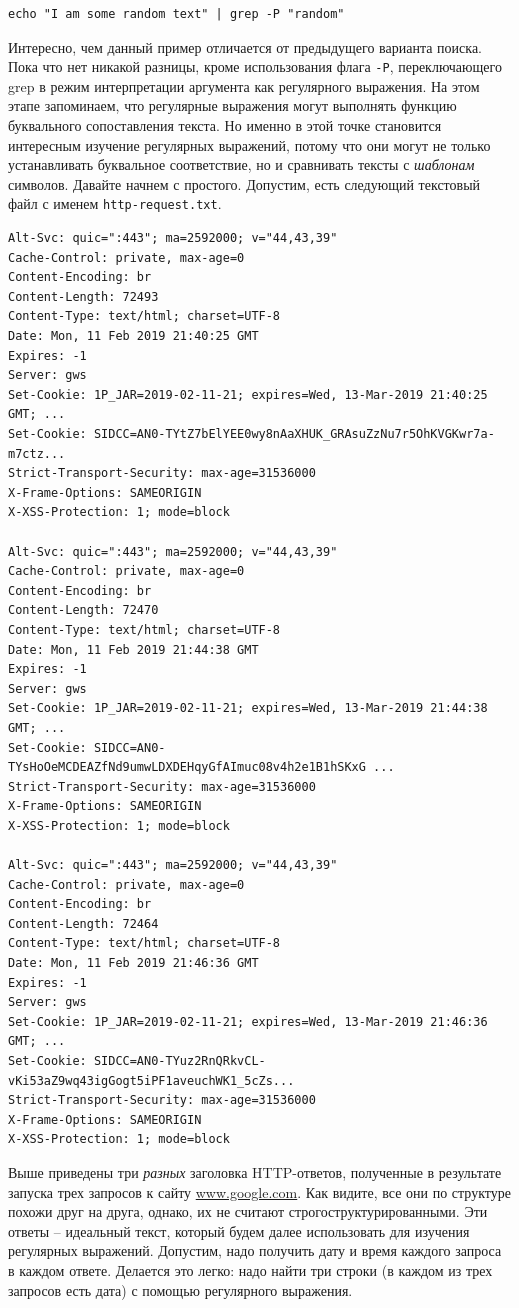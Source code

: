 \documentclass[12pt]{article}
\begin{document}
\begin{verbatim}
echo "I am some random text" | grep -P "random"
\end{verbatim}

Интересно, чем данный пример отличается от предыдущего варианта поиска.
Пока что нет никакой разницы, кроме использования флага \texttt{-P},
переключающего grep в режим интерпретации аргумента как регулярного
выражения. На этом этапе запоминаем, что регулярные выражения могут
выполнять функцию буквального сопоставления текста. Но именно в этой
точке становится интересным изучение регулярных выражений, потому что
они могут не только устанавливать буквальное соответствие, но и
сравнивать тексты с \emph{шаблонам} символов. Давайте начнем с простого.
Допустим, есть следующий текстовый файл с именем
\texttt{http-request.txt}.

\begin{verbatim}
Alt-Svc: quic=":443"; ma=2592000; v="44,43,39"
Cache-Control: private, max-age=0
Content-Encoding: br
Content-Length: 72493
Content-Type: text/html; charset=UTF-8
Date: Mon, 11 Feb 2019 21:40:25 GMT
Expires: -1
Server: gws
Set-Cookie: 1P_JAR=2019-02-11-21; expires=Wed, 13-Mar-2019 21:40:25 GMT; ...
Set-Cookie: SIDCC=AN0-TYtZ7bElYEE0wy8nAaXHUK_GRAsuZzNu7r5OhKVGKwr7a-m7ctz...
Strict-Transport-Security: max-age=31536000
X-Frame-Options: SAMEORIGIN
X-XSS-Protection: 1; mode=block

Alt-Svc: quic=":443"; ma=2592000; v="44,43,39"
Cache-Control: private, max-age=0
Content-Encoding: br
Content-Length: 72470
Content-Type: text/html; charset=UTF-8
Date: Mon, 11 Feb 2019 21:44:38 GMT
Expires: -1
Server: gws
Set-Cookie: 1P_JAR=2019-02-11-21; expires=Wed, 13-Mar-2019 21:44:38 GMT; ...
Set-Cookie: SIDCC=AN0-TYsHoOeMCDEAZfNd9umwLDXDEHqyGfAImuc08v4h2e1B1hSKxG ...
Strict-Transport-Security: max-age=31536000
X-Frame-Options: SAMEORIGIN
X-XSS-Protection: 1; mode=block

Alt-Svc: quic=":443"; ma=2592000; v="44,43,39"
Cache-Control: private, max-age=0
Content-Encoding: br
Content-Length: 72464
Content-Type: text/html; charset=UTF-8
Date: Mon, 11 Feb 2019 21:46:36 GMT
Expires: -1
Server: gws
Set-Cookie: 1P_JAR=2019-02-11-21; expires=Wed, 13-Mar-2019 21:46:36 GMT; ...
Set-Cookie: SIDCC=AN0-TYuz2RnQRkvCL-vKi53aZ9wq43igGogt5iPF1aveuchWK1_5cZs...
Strict-Transport-Security: max-age=31536000
X-Frame-Options: SAMEORIGIN
X-XSS-Protection: 1; mode=block
\end{verbatim}

Выше приведены три \emph{разных} заголовка HTTP-ответов, полученные в
результате запуска трех запросов к сайту
\href{http://www.google.com}{www.google.com}. Как видите, все они по
структуре похожи друг на друга, однако, их не считают
строгоструктурированными. Эти ответы -- идеальный текст, который будем
далее использовать для изучения регулярных выражений. Допустим, надо
получить дату и время каждого запроса в каждом ответе. Делается это
легко: надо найти три строки (в каждом из трех запросов есть дата) с
помощью регулярного выражения.
\end{document}
